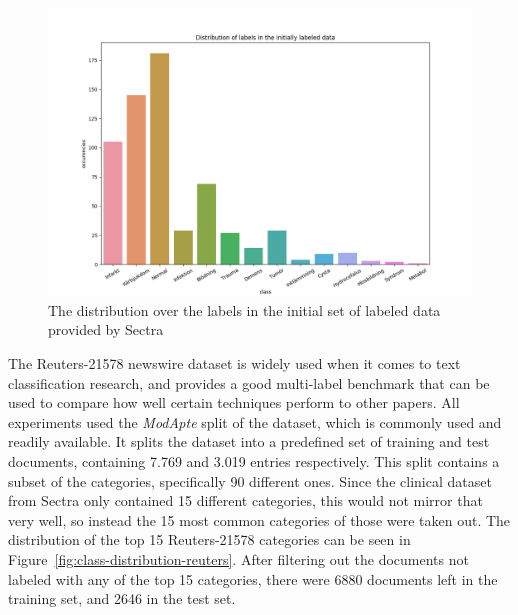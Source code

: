 \begin{figure}
    \includegraphics[width=\textwidth]{figures/class-distribution.png}
    \caption{The distribution over the labels in the initial set of labeled data provided by Sectra}
    \label{fig:class-distribution}
\end{figure}

The Reuters-21578 newswire dataset is widely used when it comes to text classification research, and provides a good multi-label benchmark that can be used to compare how well certain techniques perform to other papers.
All experiments used the \textit{ModApte} split of the dataset, which is commonly used and readily available. %
It splits the dataset into a predefined set of training and test documents, containing 7.769 and 3.019 entries respectively.
This split contains a subset of the categories, specifically 90 different ones.
Since the clinical dataset from Sectra only contained 15 different categories, this would not mirror that very well, so instead the 15 most common categories of those were taken out.
The distribution of the top 15 Reuters-21578 categories can be seen in Figure~\ref{fig:class-distribution-reuters}.
After filtering out the documents not labeled with any of the top 15 categories, there were 6880 documents left in the training set, and 2646 in the test set.

